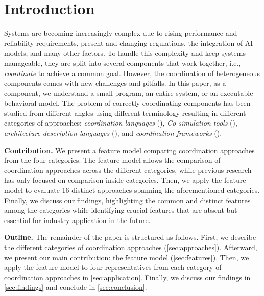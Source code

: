 \documentclass[runningheads]{llncs}
\begin{document}
\section{Introduction} \label{sec:introduction}
Systems are becoming increasingly complex due to rising performance and reliability requirements, present and changing regulations, the integration of AI models, and many other factors.
To handle this complexity and keep systems manageable, they are split into several components that work together, i.e., \textit{coordinate} to achieve a common goal.
However, the coordination of heterogeneous components comes with new challenges and pitfalls.
In this paper, as a component, we understand a small program, an entire system, or an executable behavioral model.
The problem of correctly coordinating components has been studied from different angles using different terminology resulting in different categories of approaches: \textit{coordination languages} (\cite{papadopoulosCoordinationModelsLanguages1998}), \textit{Co-simulation tools} (\cite{gomesCoSimulationSurvey2019}), \textit{architecture description languages} (\cite{clementsSurveyArchitectureDescription1996}), and \textit{coordination frameworks} (\cite{krauterBehavioralConsistencyMultimodeling2023,varalarsenBehavioralCoordinationOperator2015}).

\textbf{Contribution.} We present a feature model comparing coordination approaches from the four categories.
The feature model allows the comparison of coordination approaches across the different categories, while previous research has only focused on comparison inside categories. 
Then, we apply the feature model to evaluate 16 distinct approaches spanning the aforementioned categories.
Finally, we discuss our findings, highlighting the common and distinct features among the categories while identifying crucial features that are absent but essential for industry application in the future.


\textbf{Outline.} The remainder of the paper is structured as follows.
First, we describe the different categories of coordination approaches (\autoref{sec:approaches}).
Afterward, we present our main contribution: the feature model (\autoref{sec:features}).
Then, we apply the feature model to four representatives from each category of coordination approaches in \autoref{sec:application}.
Finally, we discuss our findings in \autoref{sec:findings} and conclude in \autoref{sec:conclusion}.
\end{document}
